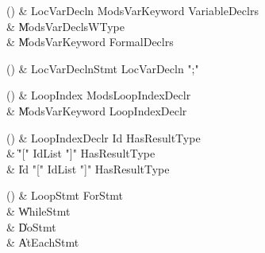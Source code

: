 \begin{bbgrammarappendix}{3.9in}

() & LocVarDecln \label{prod:LocVarDecln}  \: Mods\opt VarKeyword VariableDeclrs  \\

 &    \| Mods\opt VarDeclsWType \\
 &    \| Mods\opt VarKeyword FormalDeclrs \\

\end{bbgrammarappendix}

\begin{bbgrammarappendix}{3.5in}

() & LocVarDeclnStmt \label{prod:LocVarDeclnStmt}  \: LocVarDecln \xcd";"  \\


\end{bbgrammarappendix}

\begin{bbgrammarappendix}{4.1in}

() & LoopIndex \label{prod:LoopIndex}  \: Mods\opt LoopIndexDeclr  \\

 &    \| Mods\opt VarKeyword LoopIndexDeclr \\

\end{bbgrammarappendix}

\begin{bbgrammarappendix}{3.6in}

() & LoopIndexDeclr \label{prod:LoopIndexDeclr}  \: Id HasResultType\opt  \\

 &    \| \xcd"[" IdList \xcd"]" HasResultType\opt \\
 &    \| Id \xcd"[" IdList \xcd"]" HasResultType\opt \\

\end{bbgrammarappendix}

\begin{bbgrammarappendix}{4.2in}

() & LoopStmt \label{prod:LoopStmt}  \: ForStmt  \\

 &    \| WhileStmt \\
 &    \| DoStmt \\
 &    \| AtEachStmt \\

\end{bbgrammarappendix}

